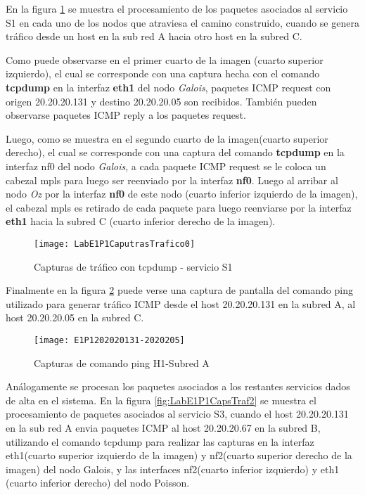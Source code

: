 En la figura \ref{fig:LabE1P1CapsTraf} se muestra el procesamiento de los paquetes asociados al servicio S1 en cada uno de los nodos que atraviesa el camino construido, cuando se genera tr\'afico desde un host en la sub red A hacia otro host en la subred C.

Como puede observarse en el primer cuarto de la imagen (cuarto superior izquierdo), el cual se corresponde con una captura hecha con el comando \textbf{tcpdump} en la interfaz \textbf{eth1} del nodo \textit{Galois}, paquetes ICMP request con origen 20.20.20.131 y destino 20.20.20.05 son recibidos. Tambi\'en pueden observarse paquetes ICMP reply a los paquetes request.

Luego, como se muestra en el segundo cuarto de la imagen(cuarto superior derecho), el cual se corresponde con una captura del comando \textbf{tcpdump} en la interfaz nf0 del nodo \textit{Galois}, a cada paquete ICMP request se le coloca un cabezal mpls para luego ser reenviado por la interfaz \textbf{nf0}. Luego al arribar al nodo \textit{Oz} por la interfaz \textbf{nf0} de este nodo (cuarto inferior izquierdo de la imagen), el cabezal mpls es retirado de cada paquete para luego reenviarse por la interfaz \textbf{eth1} hacia la subred C (cuarto inferior derecho de la imagen).

\begin{figure}[ht!] 
\centering    
\texttt{[image: LabE1P1CaputrasTrafico0]}
\caption[Capturas de tr\'afico con tcpdump - servicio S1]{Capturas de tr\'afico con tcpdump - servicio S1}
\label{fig:LabE1P1CapsTraf}
\end{figure}

Finalmente en la figura \ref{fig:LabE1P1CapHost} puede verse una captura de pantalla del comando ping utilizado para generar tr\'afico ICMP desde el host 20.20.20.131 en la subred A, al host 20.20.20.05 en la subred C.

\begin{figure}[h!] 
\centering    
\texttt{[image: E1P1202020131-2020205]}
\caption[Capturas de comando ping H1-Subred A]{Capturas de comando ping H1-Subred A}
\label{fig:LabE1P1CapHost}
\end{figure}

Análogamente se procesan los paquetes asociados a los restantes servicios dados de alta en el sistema. En la figura \ref{fig:LabE1P1CapsTraf2} se muestra el procesamiento de paquetes asociados al servicio S3, cuando el host 20.20.20.131 en la sub red A envia paquetes ICMP al host 20.20.20.67 en la subred B, utilizando el comando tcpdump para realizar las capturas en la interfaz eth1(cuarto superior izquierdo de la imagen) y nf2(cuarto superior derecho de la imagen) del nodo Galois, y las interfaces nf2(cuarto inferior izquierdo) y eth1 (cuarto inferior derecho) del nodo Poisson.

